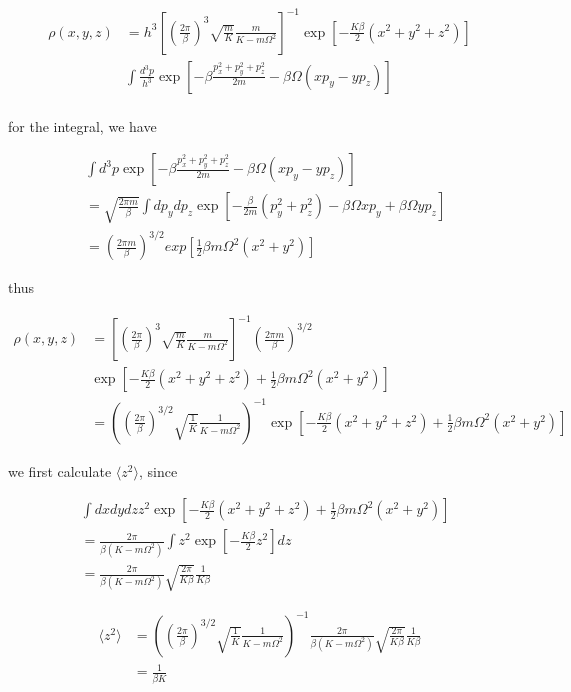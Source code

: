 \documentclass{article}
\begin{document}
$$
\begin{aligned}
    \rho(x, y, z) &= h^{3}[(\frac{2\pi}{\beta})^3\sqrt{\frac{m}{K}} \frac{m}{K - m \Omega^2}]^{-1}\exp[- \frac{K\beta}{2}(x^2 + y^2 + z^2)] \\
    &\int \frac{d^3p}{h^3} \exp[-\beta\frac{p_x^2 + p_y^2 + p_z^2}{2m} - \beta \Omega (xp_y - yp_z)]\\
\end{aligned}
$$

for the integral, we have

$$
\begin{aligned}
    &\int d^3p \exp[-\beta\frac{p_x^2 + p_y^2 + p_z^2}{2m} - \beta \Omega (xp_y - yp_z)]\\
    &= \sqrt{\frac{2\pi m}{\beta}} \int dp_y dp_z \exp[-\frac{\beta}{2m} (p_y^2 + p_z^2) - \beta \Omega x p_y + \beta \Omega yp_z]\\
    &= (\frac{2\pi m}{\beta})^{3/2} exp[\frac{1}{2}\beta m \Omega^2(x^2 + y^2)]
\end{aligned}
$$

thus

$$
\begin{aligned}
    \rho(x, y, z) &= [(\frac{2\pi}{\beta})^3\sqrt{\frac{m}{K}} \frac{m}{K - m \Omega^2}]^{-1} (\frac{2\pi m}{\beta})^{3/2}\\
    & \exp[- \frac{K\beta}{2}(x^2 + y^2 + z^2) + \frac{1}{2}\beta m \Omega^2(x^2 + y^2)]\\
    &= ((\frac{2\pi}{\beta})^{3/2}\sqrt{\frac{1}{K}} \frac{1}{K - m \Omega^2})^{-1}
    \exp[- \frac{K\beta}{2}(x^2 + y^2 + z^2) + \frac{1}{2}\beta m \Omega^2(x^2 + y^2)]
\end{aligned}
$$

we first calculate $\langle z^2 \rangle$, since

$$
\begin{aligned}
    &\int dxdydz z^2 \exp[- \frac{K\beta}{2}(x^2 + y^2 + z^2) + \frac{1}{2}\beta m \Omega^2(x^2 + y^2)]\\
    &= \frac{2\pi}{\beta (K - m\Omega^2)} \int z^2 \exp[- \frac{K\beta}{2} z^2] dz\\
    &= \frac{2\pi}{\beta (K - m\Omega^2)} \sqrt{\frac{2\pi}{K\beta}} \frac{1}{K\beta}
\end{aligned}
$$

$$
\begin{aligned}
    \langle z^2\rangle &= ((\frac{2\pi}{\beta})^{3/2}\sqrt{\frac{1}{K}} \frac{1}{K - m \Omega^2})^{-1} \frac{2\pi}{\beta (K - m\Omega^2)} \sqrt{\frac{2\pi}{K\beta}} \frac{1}{K\beta}\\
    &=\frac{1}{\beta K}\\
\end{aligned}
$$
\end{document}
